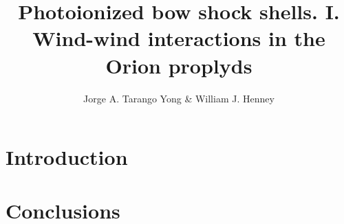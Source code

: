 \documentclass[useAMS,usenatbib]{mn2e}
\title{Photoionized bow shock shells.  I. Wind-wind interactions in the Orion proplyds}
\author{
  Jorge A. Tarango Yong \& William J. Henney\\
  \AddressCRyA
}
\begin{document}
\maketitle
\begin{abstract}
  
\end{abstract}

\section{Introduction}
\label{sec:intro}

\section{Conclusions}
\label{sec:conc}
\end{document}
